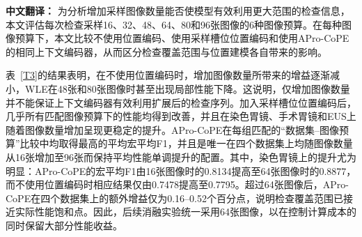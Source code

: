 \documentclass[Afour,sagev,times]{sagej}
\begin{document}
\textbf{中文翻译：} 为分析增加采样图像数量能否使模型有效利用更大范围的检查信息，本文评估每次检查采样16、32、48、64、80和96张图像的6种图像预算。在每种图像预算下，本文比较不使用位置编码、使用采样槽位位置编码和使用APro-CoPE的相同上下文编码器，从而区分检查覆盖范围与位置建模各自带来的影响。

表~\ref{T3}的结果表明，在不使用位置编码时，增加图像数量所带来的增益逐渐减小，WLE在48张和80张图像时甚至出现局部性能下降。这说明，仅增加图像数量并不能保证上下文编码器有效利用扩展后的检查序列。加入采样槽位位置编码后，几乎所有匹配图像预算下的性能均得到改善，并且在染色胃镜、手术胃镜和EUS上随着图像数量增加呈现更稳定的提升。APro-CoPE在每组匹配的“数据集--图像预算”比较中均取得最高的平均宏平均F1，并且是唯一在四个数据集上均随图像数量从16张增加至96张而保持平均性能单调提升的配置。其中，染色胃镜上的提升尤为明显：APro-CoPE的宏平均F1由16张图像时的0.8134提高至64张图像时的0.8877，而不使用位置编码时相应结果仅由0.7478提高至0.7795。超过64张图像后，APro-CoPE在四个数据集上的额外增益仅为0.16--0.52个百分点，说明检查覆盖范围已接近实际性能饱和点。因此，后续消融实验统一采用64张图像，以在控制计算成本的同时保留大部分性能收益。
\end{document}
